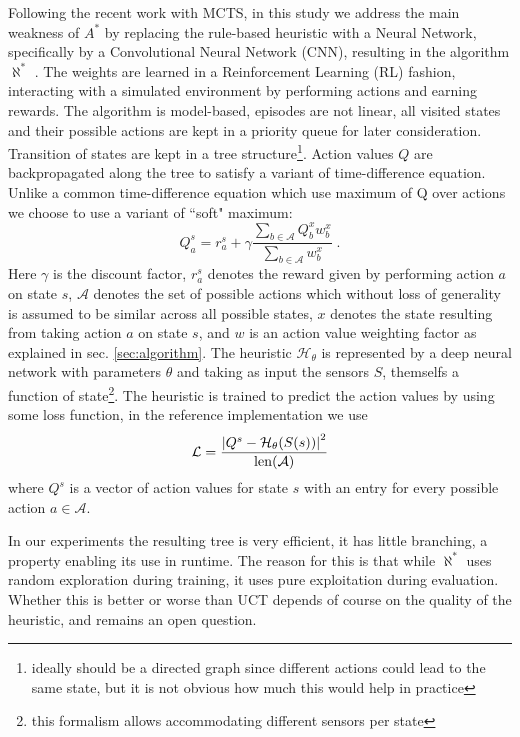 \documentclass{article}
\newcommand{\alephstar}{$\aleph^*$ }
\newcommand{\astar}{$A^*$ }
\begin{document}
Following the recent work with MCTS, in this study we address the main weakness of \astar by replacing the rule-based heuristic with a Neural Network, specifically by a Convolutional Neural Network (CNN), resulting in the algorithm \alephstar. The weights are learned in a Reinforcement Learning (RL) fashion, interacting with a simulated environment by performing actions and earning rewards. The algorithm is model-based, episodes are not linear, all visited states and their possible actions are kept in a priority queue for later consideration. Transition of states are kept in a tree structure\footnote{ideally should be a directed graph since different actions could lead to the same state, but it is not obvious how much this would help in practice}. Action values $Q$ are backpropagated along the tree to satisfy a variant of time-difference equation. Unlike a common time-difference equation which use maximum of Q over actions we choose to use a variant of ``soft" maximum:
\begin{equation}
  \label{eq:backprop}  
  Q^s_a = r^s_a + \gamma \frac{
    \sum_{b\in{\mathcal A}} {Q^x_b w^x_b}
  }{
    \sum_{b\in{\mathcal A}} {w^x_b}
  }\;.
\end{equation}
Here $\gamma$ is the discount factor, $r^s_a$ denotes the reward given by performing action $a$ on state $s$, ${\mathcal A}$ denotes the set of possible actions which without loss of generality is assumed to be similar across all possible states, $x$ denotes the state resulting from taking action $a$ on state $s$, and $w$ is an action value weighting factor as explained in sec. \ref{sec:algorithm}. The heuristic ${\mathcal H}_\theta$ is represented by a deep neural network with parameters $\theta$ and taking as input the sensors $S$, themselfs a function of state\footnote{this formalism allows accommodating different sensors per state}. The heuristic is trained to predict the action values by using some loss function, in the reference implementation we use 
\begin{equation}
  \mathcal{L} = \frac{\left| Q^s - {\mathcal H}_\theta(S(s)) \right|^2}{{\rm len}({\mathcal A})}
\end{equation}
where $Q^s$ is a vector of action values for state $s$ with an entry for every possible action $a \in \mathcal{A}$.

In our experiments the resulting tree is very efficient, it has little branching, a property enabling its use in runtime. The reason for this is that while \alephstar uses random exploration during training, it uses pure exploitation during evaluation. Whether this is better or worse than UCT depends of course on the quality of the heuristic, and remains an open question.
\end{document}
